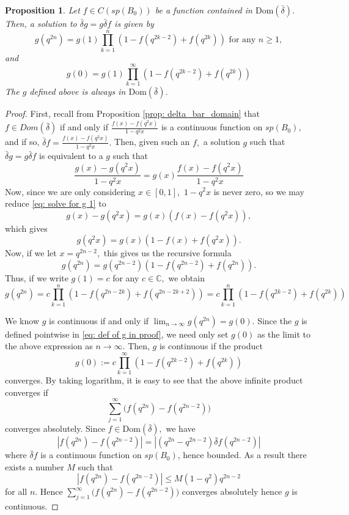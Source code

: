 \documentclass[12pt]{article}
\newtheorem{proposition}[definition]{Proposition}
\numberwithin{equation}{section}
\def\Dom{{\mathrm {Dom}}}
\def\db{\bar{\delta}}
\def\C{{\mathbb C}}
\def\d{\bar{\delta}}
\begin{document}
\begin{proposition} \label{prop: solution g in product form}
    Let $f\in C(sp(B_0))$ be a function contained in $\Dom(\db).$ Then, a solution to $\d g = g \d f$ is given by \begin{equation}\label{eq: def of g}
    g(q^{2n}) = g(1) \prod_{k = 1}^n  (1 - f(q^{2k - 2}) + f(q^{2k})) \text{ for any }n\geq 1,
    \end{equation}
    and \begin{equation}\label{eq: def of g0}
    g(0) = g(1)\prod_{k = 1}^\infty (1 - f(q^{2k - 2}) + f(q^{2k}))
    \end{equation}
   The $g$ defined above is always in $\Dom(\db)$.
\end{proposition}
\begin{proof}
    First, recall from Proposition \ref{prop: delta_bar_domain} that $f \in Dom(\db)$ if and only if $\frac{f(x) - f(q^2x)}{1 - q^2x}$ is a continuous function on $sp(B_0),$ and if so, $\d f = \frac{f(x) - f(q^2x)}{1 - q^2x}.$ Then, given such an $f,$ a solution $g$ such that $\d g = g \d f$ is equivalent to a $g$ such that 
    \begin{equation}\label{eq: solve for g 1}
    \frac{g(x) - g(q^2x)}{1 - q^2x} = g(x) \frac{f(x) - f(q^2x)}{1 - q^2x}
    \end{equation}
    Now, since we are only considering $x \in [0,1],$ $1 - q^2x$ is never zero, so we may reduce \eqref{eq: solve for g 1} to 
    $$
    g(x) - g(q^2x) = g(x) (f(x) - f(q^2x)),
     $$
     which gives
    \begin{equation}\label{eq: solve for g 2}
    g(q^2x) = g(x)(1 - f(x) + f(q^2x)).
      \end{equation}
    Now, if we let $x = q^{2n - 2},$ this gives us the recursive formula \[
    g(q^{2n}) = g(q^{2n - 2})(1 - f(q^{2n - 2}) + f(q^{2n})).
    \]
    Thus, if we write $g(1) = c$ for any $c \in \C,$ we obtain \begin{equation}\label{eq: def of g in proof}
    g(q^{2n}) = c \prod_{k = 1}^n (1 - f(q^{2n - 2k}) + f(q^{2n - 2k + 2})) = c \prod_{k = 1}^n (1 - f(q^{2k - 2}) + f(q^{2k}))
    \end{equation}
    
We know $g$ is continuous if and only if $\lim_{n \to \infty} g(q^{2n}) = g(0).$ Since the $g$ is defined pointwise in \eqref{eq: def of g in proof}, we need only set $g(0)$ as the limit to the above expression as $n \to \infty.$ Then, $g$ is continuous if the product \[
    g(0) := c \prod_{k = 1}^\infty (1 - f(q^{2k - 2}) + f(q^{2k}))
    \]
   converges. 
   By taking logarithm, it is easy to see that the above infinite product converges if \[
    \sum_{j=1}^\infty\big( f(q^{2n})- f(q^{2n-2})\big)
    \]
    converges absolutely. 
     Since $f\in \Dom(\db),$ we have \[
    |f(q^{2n})- f(q^{2n-2})| = |(q^{2n} - q^{2n - 2}) \d f(q^{2n - 2}) |
    \]
where $\db f$ is a continuous function on $sp(B_0)$, hence bounded. As a result there exists a number $M$ such that
$$|f(q^{2n})- f(q^{2n-2})|\leq M(1-q^2)q^{2n-2}$$
for all $n$. Hence $ \sum_{j=1}^\infty\big( f(q^{2n})- f(q^{2n-2})\big)$ converges absolutely hence $g$ is continuous.


\end{proof}
\end{document}
